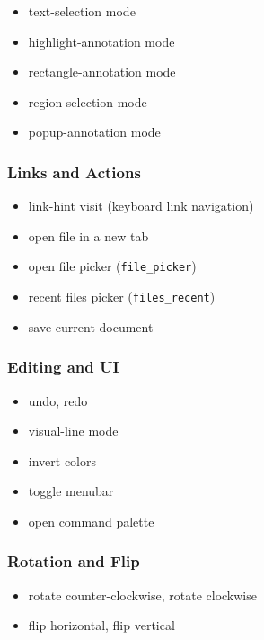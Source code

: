 \documentclass[a4paper,12pt]{article}
\begin{document}
\begin{itemize}[leftmargin=*]
    \item {} text-selection mode
    \item {} highlight-annotation mode
    \item {} rectangle-annotation mode
    \item {} region-selection mode
    \item {} popup-annotation mode
\end{itemize}

\subsubsection{Links and Actions}
\begin{itemize}[leftmargin=*]
    \item {} link-hint visit (keyboard link navigation)
    \item {} open file in a new tab
    \item {} open file picker (\texttt{file\_picker})
    \item {} recent files picker (\texttt{files\_recent})
    \item {} save current document
\end{itemize}

\subsubsection{Editing and UI}
\begin{itemize}[leftmargin=*]
    \item {} undo, \quad {} redo
    \item {} visual-line mode
    \item {} invert colors
    \item {} toggle menubar
    \item \keys{:} open command palette
\end{itemize}

\subsubsection{Rotation and Flip}
\begin{itemize}[leftmargin=*]
    \item \keys{<} rotate counter-clockwise, \quad \keys{>} rotate clockwise
    \item \keys{|} flip horizontal, \quad \keys{\_} flip vertical
\end{itemize}
\end{document}
